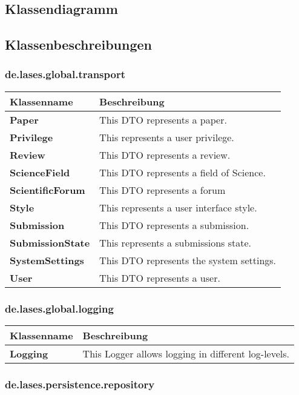
\newcommand{\classtable}[1]{\begin{longtable}[H]{m{5cm}m{9cm}}
		\hline
		\textbf{Klassenname} & \textbf{Beschreibung} \\
		\hline
		\hline
		#1
	\end{longtable}
}

\newcommand{\classentry}[2]{\textbf{#1} & #2 \\
}


\subsection{Klassendiagramm}


\subsection{Klassenbeschreibungen}

\subsubsection{de.lases.global.transport}

\classtable{
    \classentry{Paper}{This DTO represents a paper.}
    \classentry{Privilege}{This represents a user privilege.}
    \classentry{Review}{This DTO represents a review.}
    \classentry{ScienceField}{This DTO represents a field of Science.}
    \classentry{ScientificForum}{This DTO represents a forum}
    \classentry{Style}{This represents a user interface style.}
    \classentry{Submission}{This DTO represents a submission.}
    \classentry{SubmissionState}{This represents a submissions state.}
    \classentry{SystemSettings}{This DTO represents the system settings.}
    \classentry{User}{This DTO represents a user.}
}

\subsubsection{de.lases.global.logging}

\classtable{
    \classentry{Logging}{This Logger allows logging in different log-levels.}
}

\subsubsection{de.lases.persistence.repository}

